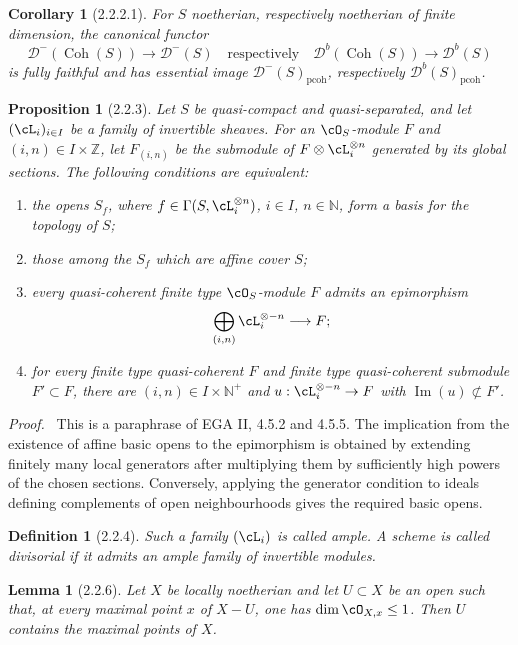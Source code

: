 \documentclass[11pt]{article}
\theoremstyle{plain}
\newtheorem*{proposition*}{Proposition}
\newtheorem*{lemma*}{Lemma}
\newtheorem*{corollary*}{Corollary}
\newtheorem*{definition*}{Definition}
\theoremstyle{definition}
\theoremstyle{remark}
\newenvironment{prooftext}{\par\noindent\textit{Proof.}\ }{\par\medskip}
\newcommand{\NN}{\mathbb N}
\newcommand{\ZZ}{\mathbb Z}
\newcommand{\D}{\mathcal D}\newcommand{\E}{\mathcal E}\newcommand{\F}{\mathcal F}
\DeclareMathOperator{\Imop}{Im}
\providecommand{\Coh}{\operatorname{Coh}}
\begin{document}
\begin{corollary*}[2.2.2.1]
For $S$ noetherian, respectively noetherian of finite dimension, the canonical functor
\[
\D^-(\Coh(S))\longrightarrow \D^-(S)
\quad\text{respectively}\quad
\D^b(\Coh(S))\longrightarrow \D^b(S)
\]
is fully faithful and has essential image $\D^-(S)_{\mathrm{pcoh}}$, respectively $\D^b(S)_{\mathrm{pcoh}}$.
\end{corollary*}

\begin{proposition*}[2.2.3]
Let $S$ be quasi-compact and quasi-separated, and let $(\cL_i)_{i\in I}$ be a family of invertible sheaves. For an $\cO_S$-module $F$ and $(i,n)\in I\times\ZZ$, let $F_{(i,n)}$ be the submodule of $F\otimes\cL_i^{\otimes n}$ generated by its global sections. The following conditions are equivalent:
\begin{enumerate}[label=(\roman*)]
\item the opens $S_f$, where $f\in\Gamma(S,\cL_i^{\otimes n})$, $i\in I$, $n\in\NN$, form a basis for the topology of $S$;
\item those among the $S_f$ which are affine cover $S$;
\item every quasi-coherent finite type $\cO_S$-module $F$ admits an epimorphism
\[
\bigoplus_{(i,n)}\cL_i^{\otimes -n}\longrightarrow F;
\]
\item for every finite type quasi-coherent $F$ and finite type quasi-coherent submodule $F'\subset F$, there are $(i,n)\in I\times\NN^+$ and $u:\cL_i^{\otimes -n}\to F$ with $\Imop(u)\not\subset F'$.
\end{enumerate}
\end{proposition*}

\begin{prooftext}
This is a paraphrase of EGA II, 4.5.2 and 4.5.5. The implication from the existence of affine basic opens to the epimorphism is obtained by extending finitely many local generators after multiplying them by sufficiently high powers of the chosen sections. Conversely, applying the generator condition to ideals defining complements of open neighbourhoods gives the required basic opens.
\end{prooftext}

\begin{definition*}[2.2.4]
Such a family $(\cL_i)$ is called ample. A scheme is called divisorial if it admits an ample family of invertible modules.
\end{definition*}

\begin{lemma*}[2.2.6]
Let $X$ be locally noetherian and let $U\subset X$ be an open such that, at every maximal point $x$ of $X-U$, one has $\dim\cO_{X,x}\le1$. Then $U$ contains the maximal points of $X$.
\end{lemma*}
\end{document}
